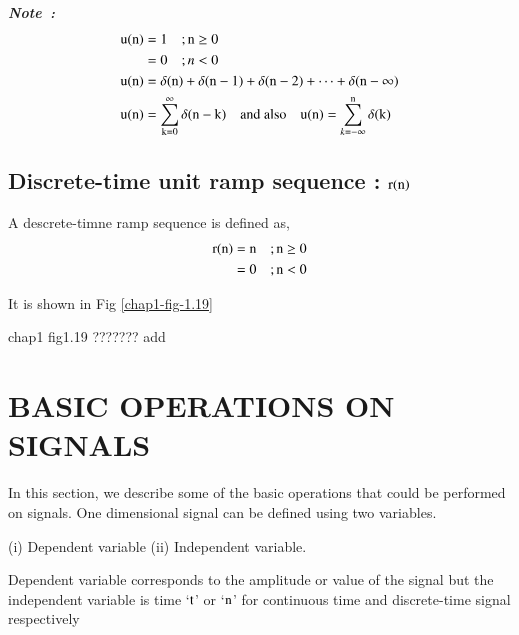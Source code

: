 \noindent
{\it \bfseries Note~:}
\begin{align*}
\textrm{u}(\textrm{n}) &= 1 \quad; \textrm{n} \geq 0\\
 &= 0 \quad ; n < 0\\
 \textrm{u} (\textrm{n}) &= \delta(\textrm{n}) + \delta(\textrm{n}-1) + \delta(\textrm{n}-2) + \cdots + \delta(\textrm{n}-\infty)\\
 \textrm{u} (\textrm{n}) &= \sum\limits_{\textrm{k} =0}^{\infty} \delta(\textrm{n} -\textrm{k})\quad \text{and also} \quad \textrm{u}(\textrm{n}) = \sum\limits_{k=-\infty}^{\textrm{n}} \delta(\textrm{k}) 
\end{align*}

\subsection{Discrete-time unit ramp sequence : $\textrm{r} (\textrm{n})$}\label{chap1-subsec-1.4.6}

A descrete-timne ramp sequence is defined as,
\begin{align*}
\textrm{r}(\textrm{n}) &= \textrm{n} \quad ; \textrm{n} \geq 0\\
 & = 0 \quad ; \textrm{n} < 0
\end{align*}

It is shown in Fig \ref{chap1-fig-1.19}
\begin{center}
chap1 fig1.19 ??????? add 
\end{center}

\section{BASIC OPERATIONS ON SIGNALS}\label{chap1-sec-1.5}

In this section, we describe some of the basic operations that could be performed on signals. One dimensional signal can be defined using two variables.

(i) Dependent variable \qquad (ii) Independent variable.

Dependent variable corresponds to the amplitude or value of the signal but the independent variable is time `$\textrm{t}$' or
`$\textrm{n}$' for continuous time and discrete-time signal respectively

